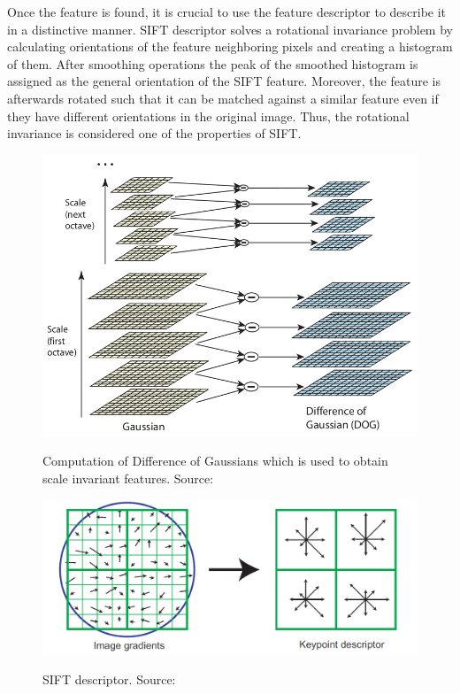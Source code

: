 Once the feature is found, it is crucial to use the feature descriptor to describe it in a distinctive manner.  SIFT descriptor solves a rotational invariance problem by calculating orientations of the feature neighboring pixels and creating a histogram of them. After smoothing operations the peak of the smoothed histogram is assigned as the general orientation of the SIFT feature. Moreover, the feature is afterwards rotated such that it can be matched against a similar feature even if they have different orientations in the original image. Thus, the rotational invariance is considered one of the properties of SIFT.

\begin{figure}
\centering

{\includegraphics[width=0.8\columnwidth]{figures/dog.png}}

\caption{Computation of Difference of Gaussians which is used to obtain scale invariant features. Source:~\cite{lowe2004distinctive}}
\label{fig:dog}
\end{figure}


\begin{figure}
\centering

{\includegraphics[width=0.8\columnwidth]{figures/sift.png}}

\caption{SIFT descriptor. Source:~\cite{lowe2004distinctive}}
\label{fig:sift}
\end{figure}

